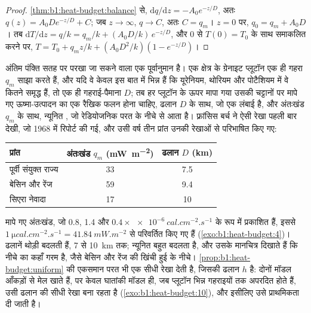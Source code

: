 \begin{proof}
\cref{thm:b1:heat-budget:balance} से, $\mathrm dq/\mathrm dz =
-A_0e^{-z/D}$, अतः $q(z) = A_0 D e^{-z/D} + C$; जब $z \to \infty$, $q \to C$,
अतः $C = q_m$। $z = 0$ पर, $q_0 = q_m + A_0 D$। तब $\mathrm dT/\mathrm dz =
q/k = q_m/k + (A_0D/k)\,e^{-z/D}$, और $0$ से $T(0) = T_0$ के साथ समाकलित करने पर,
$T = T_0 + q_m z/k + (A_0 D^2/k)(1 - e^{-z/D})$।
\end{proof}

अंतिम पंक्ति सतह पर परखा जा सकने वाला एक पूर्वानुमान है। एक क्षेत्र के ग्रेनाइट प्लूटॉन एक ही गहरा  $q_m$ साझा करते हैं, और यदि वे केवल इस बात में भिन्न हैं कि यूरेनियम, थोरियम और पोटैशियम में वे कितने समृद्ध हैं, तो एक ही गहराई-पैमाना $D$; तब हर प्लूटॉन के ऊपर मापा गया  उसकी चट्टानों पर मापे गए ऊष्मा-उत्पादन का एक रैखिक फलन होना चाहिए, ढलान $D$ के साथ, जो एक लंबाई है, और अंतःखंड $q_m$ के साथ, न्यूनित , जो रेडियोजनिक परत के नीचे से आता है। फ़्रांसिस बर्च ने ऐसी रेखा पहली बार देखी, जो 1968 में रिपोर्ट की गई, और उसी वर्ष तीन प्रांत उनकी रेखाओं से परिभाषित किए गए:
\begin{center}
\small
\begin{tabular}{lcc}
\hline
प्रांत & अंतःखंड $q_m$ (\unit{mW.m^{-2}}) & ढलान $D$ (\unit{km}) \\
\hline
पूर्वी संयुक्त राज्य & 33 & 7.5 \\
बेसिन और रेंज & 59 & 9.4 \\
सिएरा नेवादा & 17 & 10 \\
\hline
\end{tabular}
\end{center}
मापे गए अंतःखंड, जो 0.8, 1.4 और $0.4\times\qty{e-6}{cal.cm^{-2}.s^{-1}}$ के रूप में प्रकाशित हैं, इससे $\qty{1}{\micro cal.cm^{-2}.s^{-1}} = \qty{41.84}{mW.m^{-2}}$ से परिवर्तित किए गए हैं (\cref{exo:b1:heat-budget:4})। ढलानें थोड़ी बदलती हैं, 7 से \qty{10}{km} तक; न्यूनित  बहुत बदलता है, और उसके मानचित्र दिखाते हैं कि नीचे का  कहाँ गरम है, जैसे बेसिन और रेंज की खिंची हुई  के नीचे। \cref{prop:b1:heat-budget:uniform} की एकसमान परत भी एक सीधी रेखा देती है, जिसकी ढलान $h$ है: दोनों मॉडल आँकड़ों से मेल खाते हैं, पर केवल घातांकी मॉडल ही, जब प्लूटॉन भिन्न गहराइयों तक अपरदित होते हैं, उसी ढलान की सीधी रेखा बना रहता है (\cref{exo:b1:heat-budget:10}), और इसीलिए उसे प्राथमिकता दी जाती है।

